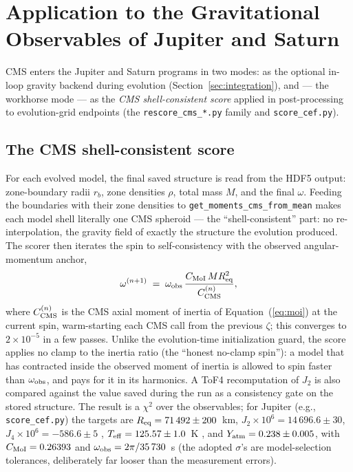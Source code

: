 \documentclass{aastex631}
\newcommand{\Req}{R_{\rm eq}}
\begin{document}
\section{Application to the Gravitational Observables of Jupiter and
Saturn}\label{sec:observables_js}

CMS enters the Jupiter and Saturn programs in two modes: as the optional
in-loop gravity backend during evolution
(Section~\ref{sec:integration}), and --- the workhorse mode --- as the
\emph{CMS shell-consistent score} applied in post-processing to
evolution-grid endpoints (the \texttt{rescore\_cms\_*.py} family and
\texttt{score\_cef.py}).

\subsection{The CMS shell-consistent score}\label{sec:score}

For each evolved model, the final saved structure is read from the HDF5
output: zone-boundary radii $r_b$, zone densities $\rho$, total mass
$M$, and the final $\omega$.  Feeding the boundaries with their zone
densities to \texttt{get\_moments\_cms\_from\_mean} makes each model
shell literally one CMS spheroid --- the ``shell-consistent'' part: no
re-interpolation, the gravity field of exactly the structure the
evolution produced.  The scorer then iterates the spin to
self-consistency with the observed angular-momentum anchor,
\begin{equation}
\omega^{(n+1)} \;=\; \omega_{\rm obs}\,
\frac{C_{\rm MoI}\, M \Req^2}{C^{(n)}_{\rm CMS}} ,
\label{eq:spinloop}
\end{equation}
where $C^{(n)}_{\rm CMS}$ is the CMS axial moment of inertia of
Equation~(\ref{eq:moi}) at the current spin, warm-starting each CMS
call from the previous $\zeta$; this converges to
$2\times10^{-5}$ in a few passes.  Unlike the evolution-time
initialization guard, the score applies no clamp to the inertia ratio
(the ``honest no-clamp spin''): a model that has contracted inside the
observed moment of inertia is allowed to spin faster than
$\omega_{\rm obs}$, and pays for it in its harmonics.  A ToF4
recomputation of $J_2$ is also compared against the value saved during
the run as a consistency gate on the stored structure.  The result is a
$\chi^2$ over the observables; for Jupiter
(e.g., \texttt{score\_cef.py}) the targets are
$\Req = 71\,492 \pm 200$~km,
$J_2 \times 10^6 = 14\,696.6 \pm 30$,
$J_4 \times 10^6 = -586.6 \pm 5$ \citep{Iess2018},
$T_{\rm eff} = 125.57 \pm 1.0$~K \citep{Li2012}, and
$Y_{\rm atm} = 0.238 \pm 0.005$, with
$C_{\rm MoI} = 0.26393$ and $\omega_{\rm obs} = 2\pi/35\,730$~s
(the adopted $\sigma$'s are model-selection tolerances, deliberately far
looser than the measurement errors).
\end{document}
